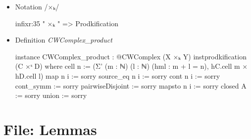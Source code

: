 \documentclass[colorinlistoftodos]{article}
\begin{document}
\begin{itemize}
  \item Notation \lean /×ₖ/
\begin{leancode}
infixr:35 " ×ₖ "  => Prodkification
\end{leancode}
  \item Definition \emph{CWComplex\_product} 
\begin{leancode}
instance CWComplex_product : @CWComplex (X ×ₖ Y) instprodkification (C ×ˢ D) where
  cell n := (Σ' (m : ℕ) (l : ℕ) (hml : m + l = n), hC.cell m × hD.cell l)
  map n i := sorry
  source_eq n i := sorry
  cont n i := sorry
  cont_symm := sorry
  pairwiseDisjoint := sorry
  mapsto n i := sorry
  closed A := sorry
  union := sorry
\end{leancode}
\end{itemize}

\section{File: Lemmas}
\end{document}
